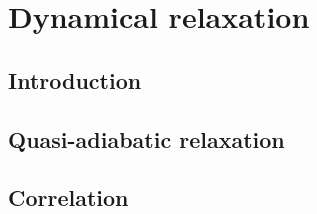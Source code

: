 \chapter{Dynamical relaxation}

\section{Introduction}

\section{Quasi-adiabatic relaxation}

\section{Correlation}

\section{}